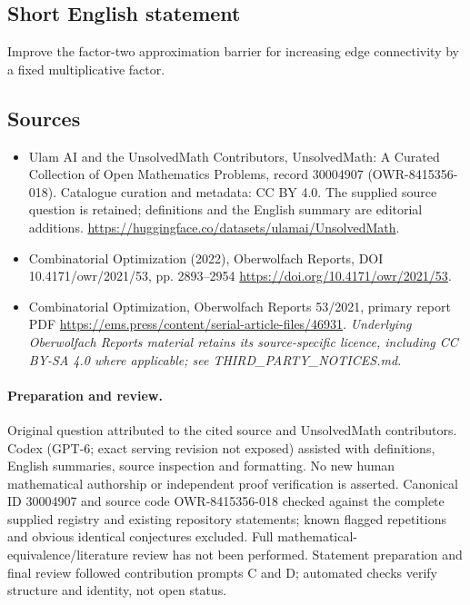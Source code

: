 \documentclass[11pt]{article}
\begin{document}
\subsection{Short English statement}
Improve the factor-two approximation barrier for increasing edge connectivity by a fixed multiplicative factor.
\subsection{Sources}
\begin{itemize}
\item[\hypertarget{source:30004907:1}{S1}] Ulam AI and the UnsolvedMath Contributors, UnsolvedMath: A Curated Collection of Open Mathematics Problems, record 30004907 (OWR-8415356-018). Catalogue curation and metadata: CC BY 4.0. The supplied source question is retained; definitions and the English summary are editorial additions.
\url{https://huggingface.co/datasets/ulamai/UnsolvedMath}.
\item[\hypertarget{source:30004907:2}{S2}] Combinatorial Optimization (2022), Oberwolfach Reports, DOI 10.4171/owr/2021/53, pp. 2893--2954
\url{https://doi.org/10.4171/owr/2021/53}.
\item[\hypertarget{source:30004907:3}{S3}] Combinatorial Optimization, Oberwolfach Reports 53/2021, primary report PDF
\url{https://ems.press/content/serial-article-files/46931}.
\textit{Underlying Oberwolfach Reports material retains its source-specific licence, including CC BY-SA 4.0 where applicable; see THIRD\_PARTY\_NOTICES.md.}
\end{itemize}
\paragraph{Preparation and review.}
Original question attributed to the cited source and UnsolvedMath contributors. Codex (GPT-6; exact serving revision not exposed) assisted with definitions, English summaries, source inspection and formatting. No new human mathematical authorship or independent proof verification is asserted. Canonical ID 30004907 and source code OWR-8415356-018 checked against the complete supplied registry and existing repository statements; known flagged repetitions and obvious identical conjectures excluded. Full mathematical-equivalence/literature review has not been performed. Statement preparation and final review followed contribution prompts C and D; automated checks verify structure and identity, not open status.
\label{end:30004907}
\end{document}
